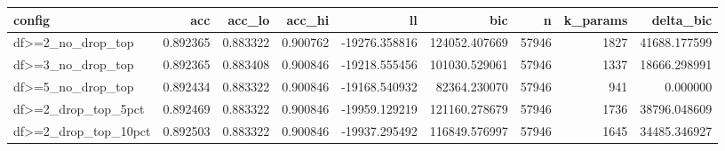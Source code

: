 \begin{tabular}{lrrrrrrrr}
\toprule
config & acc & acc\_lo & acc\_hi & ll & bic & n & k\_params & delta\_bic \\
\midrule
df>=2\_no\_drop\_top & 0.892365 & 0.883322 & 0.900762 & -19276.358816 & 124052.407669 & 57946 & 1827 & 41688.177599 \\
df>=3\_no\_drop\_top & 0.892365 & 0.883408 & 0.900846 & -19218.555456 & 101030.529061 & 57946 & 1337 & 18666.298991 \\
df>=5\_no\_drop\_top & 0.892434 & 0.883322 & 0.900846 & -19168.540932 & 82364.230070 & 57946 & 941 & 0.000000 \\
df>=2\_drop\_top\_5pct & 0.892469 & 0.883322 & 0.900846 & -19959.129219 & 121160.278679 & 57946 & 1736 & 38796.048609 \\
df>=2\_drop\_top\_10pct & 0.892503 & 0.883322 & 0.900846 & -19937.295492 & 116849.576997 & 57946 & 1645 & 34485.346927 \\
\bottomrule
\end{tabular}
